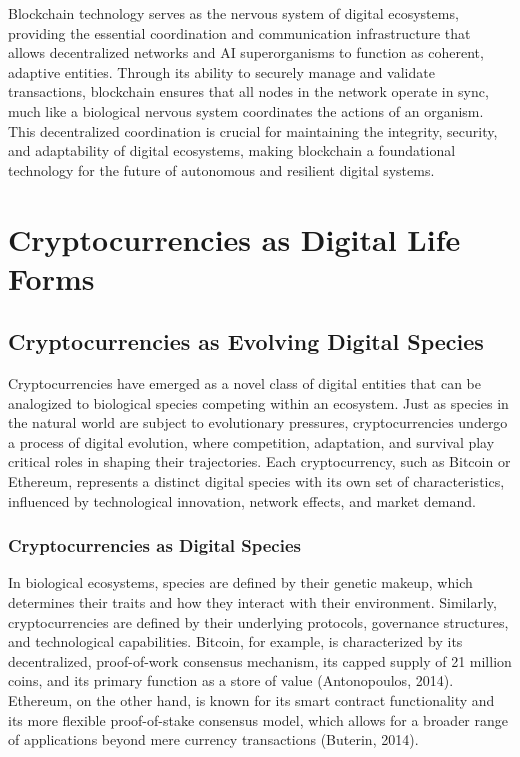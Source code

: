 \documentclass[12pt,twoside]{article}
\begin{document}
Blockchain technology serves as the nervous system of digital ecosystems, providing the essential coordination and communication infrastructure that allows decentralized networks and AI superorganisms to function as coherent, adaptive entities. Through its ability to securely manage and validate transactions, blockchain ensures that all nodes in the network operate in sync, much like a biological nervous system coordinates the actions of an organism. This decentralized coordination is crucial for maintaining the integrity, security, and adaptability of digital ecosystems, making blockchain a foundational technology for the future of autonomous and resilient digital systems.


\section{Cryptocurrencies as Digital Life Forms}

\subsection{Cryptocurrencies as Evolving Digital Species}
Cryptocurrencies have emerged as a novel class of digital entities that can be analogized to biological species competing within an ecosystem. Just as species in the natural world are subject to evolutionary pressures, cryptocurrencies undergo a process of digital evolution, where competition, adaptation, and survival play critical roles in shaping their trajectories. Each cryptocurrency, such as Bitcoin or Ethereum, represents a distinct digital species with its own set of characteristics, influenced by technological innovation, network effects, and market demand.

\subsubsection{Cryptocurrencies as Digital Species}

In biological ecosystems, species are defined by their genetic makeup, which determines their traits and how they interact with their environment. Similarly, cryptocurrencies are defined by their underlying protocols, governance structures, and technological capabilities. Bitcoin, for example, is characterized by its decentralized, proof-of-work consensus mechanism, its capped supply of 21 million coins, and its primary function as a store of value (Antonopoulos, 2014). Ethereum, on the other hand, is known for its smart contract functionality and its more flexible proof-of-stake consensus model, which allows for a broader range of applications beyond mere currency transactions (Buterin, 2014).
\end{document}
